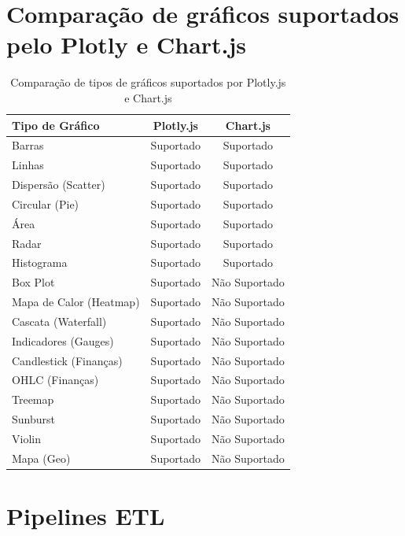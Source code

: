 \chapter{Comparação de gráficos suportados pelo Plotly e Chart.js}
\label{ch:charts}

\begin{table}[H]
\centering
\caption{Comparação de tipos de gráficos suportados por Plotly.js e Chart.js}
\begin{tabular}{|l|c|c|}
\hline
\textbf{Tipo de Gráfico} & \textbf{Plotly.js} & \textbf{Chart.js} \\
\hline
Barras                         & Suportado & Suportado \\
Linhas                         & Suportado & Suportado \\
Dispersão (Scatter)            & Suportado & Suportado \\
Circular (Pie)                 & Suportado & Suportado \\
Área                           & Suportado & Suportado \\
Radar                          & Suportado & Suportado \\
Histograma                     & Suportado & Suportado \\
Box Plot                       & Suportado & Não Suportado \\
Mapa de Calor (Heatmap)        & Suportado & Não Suportado \\
Cascata (Waterfall)            & Suportado & Não Suportado \\
Indicadores (Gauges)           & Suportado & Não Suportado \\
Candlestick (Finanças)         & Suportado & Não Suportado \\
OHLC (Finanças)                & Suportado & Não Suportado \\
Treemap                        & Suportado & Não Suportado \\
Sunburst                       & Suportado & Não Suportado \\
Violin                         & Suportado & Não Suportado \\
Mapa (Geo)                     & Suportado & Não Suportado \\
\hline
\end{tabular}
\label{tab:charts}
\end{table}


\chapter{Pipelines ETL}
\label{ch:etl}

